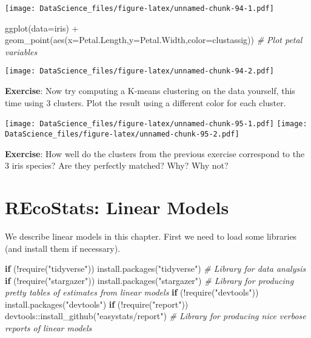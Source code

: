 \documentclass[
]{book}
\newenvironment{Shaded}{\begin{snugshade}}{\end{snugshade}}
\newcommand{\AttributeTok}[1]{\textcolor[rgb]{0.77,0.63,0.00}{#1}}
\newcommand{\CommentTok}[1]{\textcolor[rgb]{0.56,0.35,0.01}{\textit{#1}}}
\newcommand{\ControlFlowTok}[1]{\textcolor[rgb]{0.13,0.29,0.53}{\textbf{#1}}}
\newcommand{\FunctionTok}[1]{\textcolor[rgb]{0.00,0.00,0.00}{#1}}
\newcommand{\NormalTok}[1]{#1}
\newcommand{\SpecialCharTok}[1]{\textcolor[rgb]{0.00,0.00,0.00}{#1}}
\newcommand{\StringTok}[1]{\textcolor[rgb]{0.31,0.60,0.02}{#1}}
\begin{document}
\texttt{[image: DataScience\_files/figure-latex/unnamed-chunk-94-1.pdf]}

\begin{Shaded}
\begin{Highlighting}[]
\FunctionTok{ggplot}\NormalTok{(}\AttributeTok{data=}\NormalTok{iris) }\SpecialCharTok{+} \FunctionTok{geom\_point}\NormalTok{(}\FunctionTok{aes}\NormalTok{(}\AttributeTok{x=}\NormalTok{Petal.Length,}\AttributeTok{y=}\NormalTok{Petal.Width,}\AttributeTok{color=}\NormalTok{clustassig)) }\CommentTok{\# Plot petal variables}
\end{Highlighting}
\end{Shaded}

\texttt{[image: DataScience\_files/figure-latex/unnamed-chunk-94-2.pdf]}

\textbf{Exercise}: Now try computing a K-means clustering on the data yourself, this time using 3 clusters. Plot the result using a different color for each cluster.

\texttt{[image: DataScience\_files/figure-latex/unnamed-chunk-95-1.pdf]} \texttt{[image: DataScience\_files/figure-latex/unnamed-chunk-95-2.pdf]}

\textbf{Exercise}: How well do the clusters from the previous exercise correspond to the 3 iris species? Are they perfectly matched? Why? Why not?

\hypertarget{recostats-linear-models}{%
\chapter{REcoStats: Linear Models}\label{recostats-linear-models}}

We describe linear models in this chapter. First we need to load some libraries (and install them if necessary).

\begin{Shaded}
\begin{Highlighting}[]
\ControlFlowTok{if}\NormalTok{ (}\SpecialCharTok{!}\FunctionTok{require}\NormalTok{(}\StringTok{"tidyverse"}\NormalTok{)) }\FunctionTok{install.packages}\NormalTok{(}\StringTok{"tidyverse"}\NormalTok{) }\CommentTok{\# Library for data analysis}
\ControlFlowTok{if}\NormalTok{ (}\SpecialCharTok{!}\FunctionTok{require}\NormalTok{(}\StringTok{"stargazer"}\NormalTok{)) }\FunctionTok{install.packages}\NormalTok{(}\StringTok{"stargazer"}\NormalTok{) }\CommentTok{\# Library for producing pretty tables of estimates from linear models}
\ControlFlowTok{if}\NormalTok{ (}\SpecialCharTok{!}\FunctionTok{require}\NormalTok{(}\StringTok{"devtools"}\NormalTok{)) }\FunctionTok{install.packages}\NormalTok{(}\StringTok{"devtools"}\NormalTok{)}
\ControlFlowTok{if}\NormalTok{ (}\SpecialCharTok{!}\FunctionTok{require}\NormalTok{(}\StringTok{"report"}\NormalTok{)) devtools}\SpecialCharTok{::}\FunctionTok{install\_github}\NormalTok{(}\StringTok{"easystats/report"}\NormalTok{) }\CommentTok{\# Library for producing nice verbose reports of linear models}
\end{Highlighting}
\end{Shaded}
\end{document}
